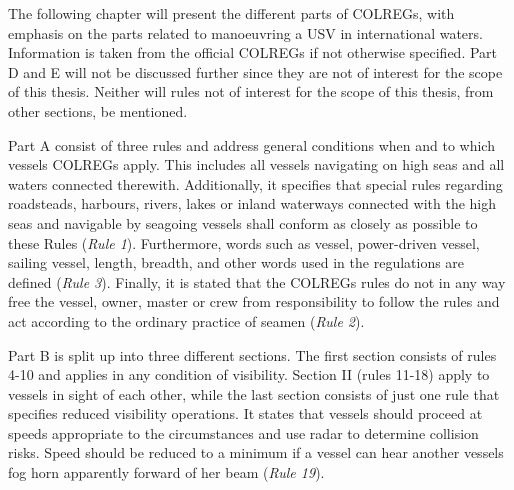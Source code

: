 The following chapter will present the different parts of COLREGs, with emphasis on the parts related to manoeuvring a USV in international waters. Information is taken from the official COLREGs \cite{colreg} if not otherwise specified. Part D and E will not be discussed further since they are not of interest for the scope of this thesis. Neither will rules not of interest for the scope of this thesis, from other sections, be mentioned.

Part A consist of three rules and address general conditions when and to which vessels COLREGs apply. This includes all vessels navigating on high seas and all waters connected therewith. Additionally, it specifies that special rules regarding roadsteads, harbours, rivers, lakes or inland waterways connected with the high seas and navigable by seagoing vessels shall conform as closely as possible to these Rules (\textit{Rule 1}). Furthermore, words such as vessel, power-driven vessel, sailing vessel, length, breadth, and other words used in the regulations are defined (\textit{Rule 3}). Finally, it is stated that the COLREGs rules do not in any way free the vessel, owner, master or crew from responsibility to follow the rules and act according to the ordinary practice of seamen (\textit{Rule 2}).

Part B is split up into three different sections. The first section consists of rules 4-10 and applies in any condition of visibility. Section II (rules 11-18) apply to vessels in sight of each other, while the last section consists of just one rule that specifies reduced visibility operations. It states that vessels should proceed at speeds appropriate to the circumstances and use radar to determine collision risks. Speed should be reduced to a minimum if a vessel can hear another vessels fog horn apparently forward of her beam (\textit{Rule 19}).


